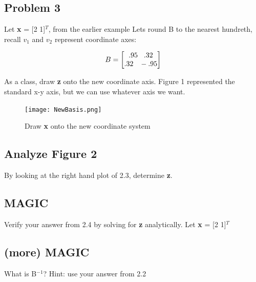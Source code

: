 \documentclass[11pt]{article}
\begin{document}
\subsection{Problem 3}
Let \textbf{x} = [2 1]$^T$, from the earlier example\newline
Lets round B to the nearest hundreth, recall $v_1$ and $v_2$ represent coordinate axes:

\begin{center}



\[
B =
\begin{bmatrix}

.95  \hspace{3mm} .32 \\
.32  \hspace{3mm} -.95

\end{bmatrix}
\]

\vspace{3mm}

As a class, draw \textbf{z} onto the new coordinate axis. Figure 1 represented the standard x-y axis, but we can use whatever axis we want.


\begin{figure}[h]
\centering
\texttt{[image: NewBasis.png]}
\caption {Draw \textbf{x} onto the new coordinate system}
\end{figure}


\end{center}


\newpage


\subsection{Analyze Figure 2}
By looking at the right hand plot of 2.3, determine \textbf{z}.


\vspace{5mm}
\subsection{MAGIC}
Verify your answer from 2.4 by solving for \textbf{z} analytically. Let \textbf{x} = [2 1]$^T$

\vspace{5mm}
\subsection{(more) MAGIC}
What is B$^{-1}$? Hint: use your answer from 2.2
\end{document}
